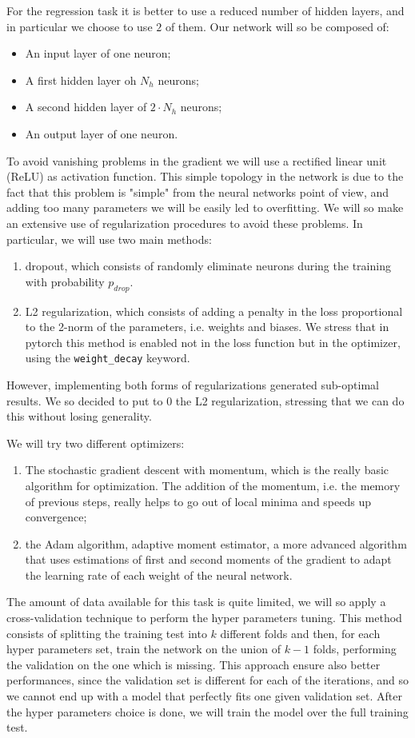 For the regression task it is better to use a reduced number of hidden layers, and in particular we choose to use $2$ of them.
Our network will so be composed of:
\begin{itemize}
    \item An input layer of one neuron;
    \item A first hidden layer oh $N_h$ neurons;
    \item A second hidden layer of $2\cdot N_h$ neurons;
    \item An output layer of one neuron.
\end{itemize}
To avoid vanishing problems in the gradient we will use a rectified linear unit (ReLU) as activation function.
This simple topology in the network is due to the fact that this problem is "simple" from the neural networks point of view, and adding too many parameters we 
will be easily led to overfitting. We will so make an extensive use of regularization procedures to avoid these problems. In 
particular, we will use two main methods:
\begin{enumerate}
    \item dropout, which consists of randomly eliminate neurons during the training with probability $p_{drop}$.    
    \item L2 regularization, which consists of adding a penalty in the loss proportional to the 2-norm
        of the parameters, i.e. weights and biases. We stress that in pytorch this method is enabled not in the loss
        function but in the optimizer, using the \lstinline{weight_decay} keyword.
\end{enumerate}
However, implementing both forms of regularizations generated sub-optimal results. We so decided to put to $0$ the L2
regularization, stressing that we can do this without losing generality.

We will try two different optimizers:
\begin{enumerate}
    \item The stochastic gradient descent with momentum, which is the really basic algorithm for optimization.
        The addition of the momentum, i.e. the memory of previous steps, really helps to go out of local minima and speeds up convergence;
    \item the Adam algorithm, adaptive moment estimator, a more advanced algorithm that uses estimations of first and second 
        moments  of the gradient to adapt the learning rate of each weight of the neural network.
\end{enumerate}
The amount of data available for this task is quite limited, we will so apply a cross-validation technique to perform the 
hyper parameters tuning. This method consists of splitting the training test into $k$ different folds and then, for each
hyper parameters set, train the network on the union of $k-1$ folds, performing the validation on the one which is missing.
This approach ensure also better performances, since the validation set is different for each of the iterations, and so we
cannot end up with a model that perfectly fits one given validation set.
After the hyper parameters choice is done, we will train the model over the full training test.

